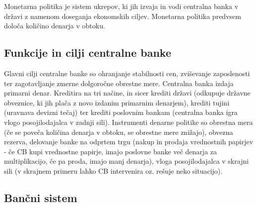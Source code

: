 \documentclass[letterpaper, titlepage, freqn]{article}
\begin{document}
Monetarna politika je sistem ukrepov, ki jih izvaja in vodi centralna banka v državi z namenom doseganja ekonomskih ciljev. Monetarna politika predvsem določa količino denarja v obtoku.\\

\subsection{Funkcije in cilji centralne banke}

Glavni cilji centralne banke so ohranjanje stabilnosti cen, zviševanje zaposlenosti ter zagotavljanje zmerne dolgoročne obrestne mere.
Centralna banka izdaja primarni denar. Kreditira na tri načine, in sicer krediti državi (odkupuje državne obveznice, ki jih plača z novo izdanim primarnim denarjem), krediti tujini (uravnava devizni tečaj) ter krediti poslovnim bankam (centralna banka igra vlogo posojilodajalca v zadnji sili).
Instrumenti denarne politike so obrestna mera (če se poveča količina denarja v obtoku, se obrestne mere znižajo), obvezna rezerva, delovanje banke na odprtem trgu (nakup in prodaja vrednostnih papirjev - če CB kupi vrednostne papirje, imajo poslovne banke več denarja za multiplikacijo, če pa proda, imajo manj denarja), vloga posojilodajalca v skrajni sili (v skrajnem primeru lahko CB intervenira oz. rešuje neko situacijo).\\

\subsection{Bančni sistem}
\end{document}
